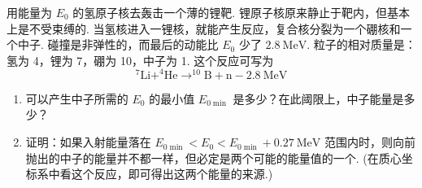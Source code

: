 \begin{exercise}\label{ex:5.10}
用能量为 $E_0$ 的氢原子核去轰击一个薄的锂靶. 锂原子核原来静止于靶内，但基本上是不受束缚的. 当氢核进入一锂核，就能产生反应，复合核分裂为一个硼核和一个中子. 碰撞是非弹性的，而最后的动能比 $E_0$ 少了 $2.8 \ \mathrm{MeV}$. 粒子的相对质量是：氢为 4，锂为 7，硼为 10，中子为 1. 这个反应可写为
$$ ^7\mathrm{Li} + ^4\mathrm{He} \rightarrow ^{10}\mathrm{B} + \mathrm{n} - 2.8 \ \mathrm{MeV} $$
\begin{enumerate}
  \item[(a)] 可以产生中子所需的 $E_0$ 的最小值 $E_{0\min}$ 是多少？在此阈限上，中子能量是多少？
  \item[(b)] 证明：如果入射能量落在 $E_{0\min} < E_0 < E_{0\min} + 0.27 \ \mathrm{MeV}$ 范围内时，则向前抛出的中子的能量并不都一样，但必定是两个可能的能量值的一个. (在质心坐标系中看这个反应，即可得出这两个能量的来源.)
\end{enumerate}
\end{exercise}
